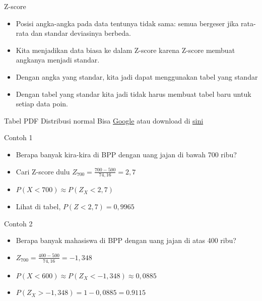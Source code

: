 \documentclass[
  ignorenonframetext,
]{beamer}
\begin{document}
\begin{frame}{Z-score}
\label{z-score-3}
\begin{itemize}
\item
  Posisi angka-angka pada data tentunya tidak sama: semua bergeser jika
  rata-rata dan standar deviasinya berbeda.
\item
  Kita menjadikan data biasa ke dalam Z-score karena Z-score membuat
  angkanya menjadi standar.
\item
  Dengan angka yang standar, kita jadi dapat menggunakan tabel yang
  standar
\item
  Dengan tabel yang standar kita jadi tidak harus membuat tabel baru
  untuk setiap data poin.
\end{itemize}
\end{frame}

\begin{frame}{Tabel PDF Distribusi normal}
\label{tabel-pdf-distribusi-normal}
Bisa
\href{https://www.google.com/search?client=firefox-b-d&q=z+score+table}{Google}
atau download di
\href{https://drive.google.com/file/d/1ywI58hnM8p0ZyFV7B9rCOosk72iCGguq/view?usp=sharing}{sini}
\end{frame}

\begin{frame}{Contoh 1}
\label{contoh-1-1}
\begin{itemize}
\item
  Berapa banyak kira-kira di BPP dengan uang jajan di bawah 700 ribu?
\item
  Cari Z-score dulu \(Z_{700}=\frac{700-500}{74,16}=2,7\)
\item
  \(P(X<700) \approx P(Z_X<2,7)\)
\item
  Lihat di tabel, \(P(Z<2,7)=0,9965\)
\end{itemize}
\end{frame}

\begin{frame}{Contoh 2}
\label{contoh-2-1}
\begin{itemize}
\item
  Berapa banyak mahasiswa di BPP dengan uang jajan di atas 400 ribu?
\item
  \(Z_{700}=\frac{400-500}{74,16}=-1,348\)
\item
  \(P(X<600) \approx P(Z_X<-1,348) \approx 0,0885\)
\item
  \(P(Z_X>-1,348)=1-0,0885=0.9115\)
\end{itemize}
\end{frame}
\end{document}
